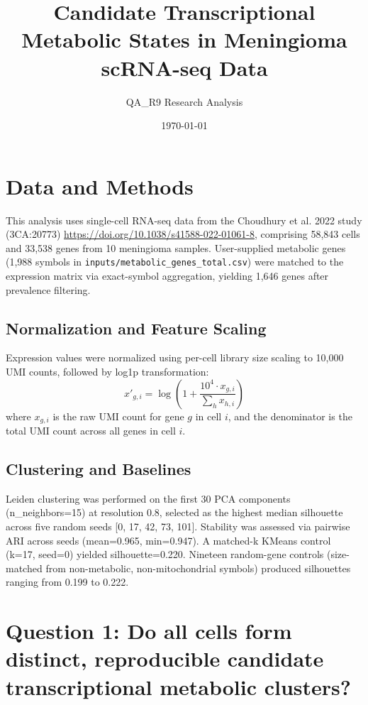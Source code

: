 \documentclass[11pt, a4paper]{article}
\title{\textbf{Candidate Transcriptional Metabolic States in Meningioma scRNA-seq Data}}
\author{QA\_R9 Research Analysis}
\date{\today}
\begin{document}
\maketitle

\section{Data and Methods}

This analysis uses single-cell RNA-seq data from the Choudhury et al. 2022 study (3CA:20773) \url{https://doi.org/10.1038/s41588-022-01061-8}, comprising 58,843 cells and 33,538 genes from 10 meningioma samples. User-supplied metabolic genes (1,988 symbols in \texttt{inputs/metabolic\_genes\_total.csv}) were matched to the expression matrix via exact-symbol aggregation, yielding 1,646 genes after prevalence filtering.

\subsection{Normalization and Feature Scaling}

Expression values were normalized using per-cell library size scaling to 10,000 UMI counts, followed by log1p transformation:
\begin{equation}
\label{eq:normalization}
x'_{g,i} = \log\left(1 + \frac{10^4 \cdot x_{g,i}}{\sum_{h} x_{h,i}}\right)
\end{equation}
where $x_{g,i}$ is the raw UMI count for gene $g$ in cell $i$, and the denominator is the total UMI count across all genes in cell $i$.

\subsection{Clustering and Baselines}

Leiden clustering was performed on the first 30 PCA components (n\_neighbors=15) at resolution 0.8, selected as the highest median silhouette across five random seeds [0, 17, 42, 73, 101]. Stability was assessed via pairwise ARI across seeds (mean=0.965, min=0.947). A matched-k KMeans control (k=17, seed=0) yielded silhouette=0.220. Nineteen random-gene controls (size-matched from non-metabolic, non-mitochondrial symbols) produced silhouettes ranging from 0.199 to 0.222.

\section{Question 1: Do all cells form distinct, reproducible candidate transcriptional metabolic clusters?}
\end{document}
